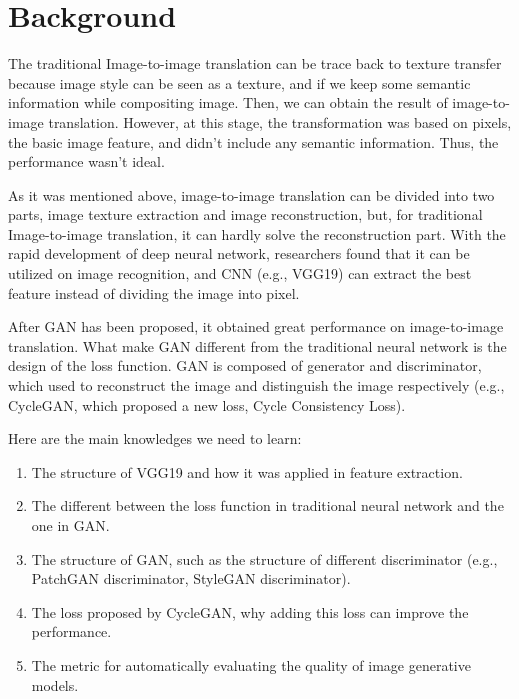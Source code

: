 \section{Background}
The traditional Image-to-image translation can be trace back to texture transfer because image style can be seen as a texture, and if we keep some semantic information while compositing image. Then, we can obtain the result of image-to-image translation. However, at this stage, the transformation was based on pixels, the basic image feature, and didn’t include any semantic information. Thus, the performance wasn’t ideal. 

As it was mentioned above, image-to-image translation can be divided into two parts, image texture extraction and image reconstruction, but, for traditional Image-to-image translation, it can hardly solve the reconstruction part. With the rapid development of deep neural network, researchers found that it can be utilized on image recognition, and CNN (e.g., VGG19) can extract the best feature instead of dividing the image into pixel. 

After GAN has been proposed, it obtained great performance on image-to-image translation. What make GAN different from the traditional neural network is the design of the loss function. GAN is composed of generator and discriminator, which used to reconstruct the image and distinguish the image respectively (e.g., CycleGAN, which proposed a new loss, Cycle Consistency Loss). 

Here are the main knowledges we need to learn:
\begin{enumerate}
  \item The structure of VGG19 and how it was applied in feature extraction.
  \item The different between the loss function in traditional neural network and the one in GAN.
  \item The structure of GAN, such as the structure of different discriminator (e.g., PatchGAN discriminator, StyleGAN discriminator).
  \item The loss proposed by CycleGAN, why adding this loss can improve the performance.
  \item The metric for automatically evaluating the quality of image generative models.
\end{enumerate}
